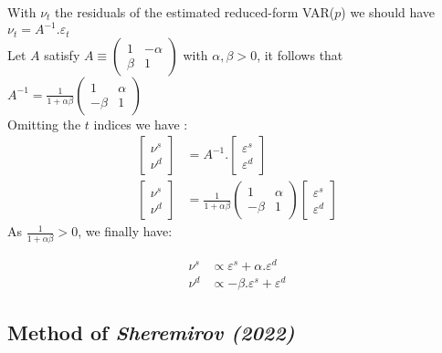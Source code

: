 \vspace*{.4cm}
\noindent With $\nu_{t}$ the residuals of the estimated reduced-form VAR($p$) we should have $\nu_{t} = A^{-1}.\varepsilon_{t}$\\
Let $A$ satisfy $
    A \equiv\begin{pmatrix} 1 & - \alpha \\ \beta & 1 \end{pmatrix}
    $ 
with $\alpha, \beta > 0$, it follows that
$
A^{-1} = \frac{1}{1+\alpha \beta}\begin{pmatrix} 1 & \alpha \\ -\beta & 1 \end{pmatrix}
$\\
Omitting the $t$ indices we have : 
\begin{align*}
    \begin{bmatrix} \nu^{s} \\ \nu^{d} \end{bmatrix} &= A^{-1}.\begin{bmatrix} \varepsilon^{s} \\ \varepsilon^{d} \end{bmatrix} \\
    \begin{bmatrix} \nu^{s} \\ \nu^{d} \end{bmatrix} &= \frac{1}{1+\alpha \beta}\begin{pmatrix} 1 & \alpha \\ -\beta & 1 \end{pmatrix} \begin{bmatrix} \varepsilon^{s} \\ \varepsilon^{d} \end{bmatrix}
\end{align*}
As $\frac{1}{1+\alpha \beta} > 0$, we finally have:

\begin{align*}
    \nu^{s} &\propto \varepsilon^{s} + \alpha.\varepsilon^{d} \\
    \nu^{d} &\propto -\beta.\varepsilon^{s} + \varepsilon^{d}
\end{align*}






\subsection{Method of \textit{Sheremirov (2022)}}